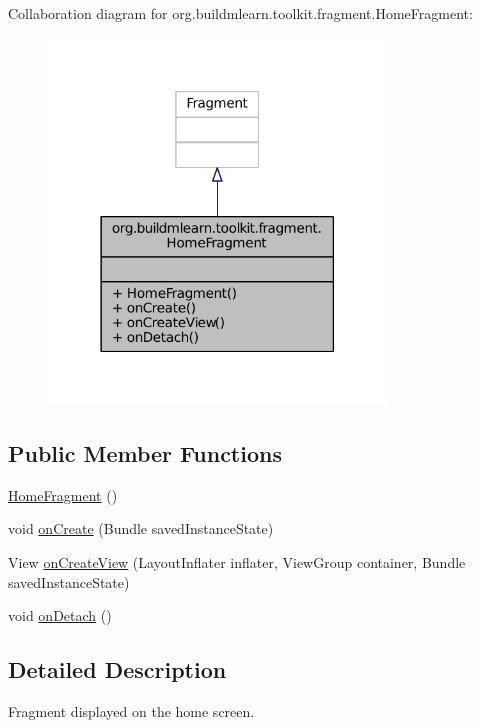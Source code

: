 Collaboration diagram for org.\-buildmlearn.\-toolkit.\-fragment.\-Home\-Fragment\-:
\nopagebreak
\begin{figure}[H]
\begin{center}
\leavevmode
\includegraphics[width=254pt]{d8/d53/classorg_1_1buildmlearn_1_1toolkit_1_1fragment_1_1HomeFragment__coll__graph}
\end{center}
\end{figure}
\subsection*{Public Member Functions}
\begin{DoxyCompactItemize}
\item 
\hyperlink{classorg_1_1buildmlearn_1_1toolkit_1_1fragment_1_1HomeFragment_aa73214b830d5818f31e52a160aefa3e1}{Home\-Fragment} ()
\item 
void \hyperlink{classorg_1_1buildmlearn_1_1toolkit_1_1fragment_1_1HomeFragment_a183d132e866fbc3af61341c95323be94}{on\-Create} (Bundle saved\-Instance\-State)
\item 
View \hyperlink{classorg_1_1buildmlearn_1_1toolkit_1_1fragment_1_1HomeFragment_a80599e92f595260551a0d5753021ebfc}{on\-Create\-View} (Layout\-Inflater inflater, View\-Group container, Bundle saved\-Instance\-State)
\item 
void \hyperlink{classorg_1_1buildmlearn_1_1toolkit_1_1fragment_1_1HomeFragment_a914cfd284407c1daa41b81396c45ef34}{on\-Detach} ()
\end{DoxyCompactItemize}


\subsection{Detailed Description}
Fragment displayed on the home screen. 

